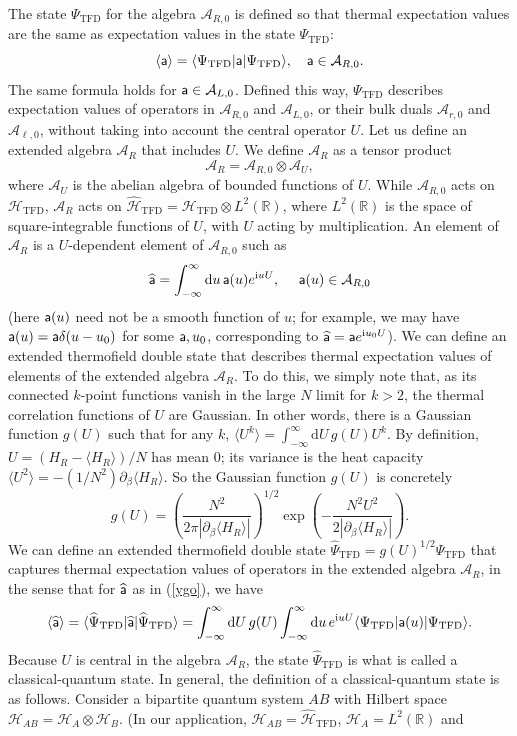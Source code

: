 \documentclass[11pt,a4paper]{article}
\def\a{{\sf a}}
\def\i{{\mathrm i}}
\def\be{\begin{equation}}
\def\ee{\end{equation}}
\def\h{\widehat}
\def\A{{\mathcal A}}
\def\d{{\mathrm d}}
\def\R{{\mathbb R}}
\def\U{{ U}}
\def\h{\widehat}
\def\la{\langle}
\def\ra{\rangle}
\def\H{{\mathcal H}}
\def\TFD{{\mathrm{TFD}}}
\begin{document}
The state $\Psi_\TFD$ for the algebra $\A_{R,0}$ is defined so that thermal expectation values are the same as expectation values in the state $\Psi_\TFD$:
\be\label{wonko} \la \a\ra=\la\Psi_\TFD|\a|\Psi_\TFD\ra,~~~ \a\in \A_{R,0}.\ee
The same formula holds for $\a\in\A_{L,0}$.   Defined this way, $\Psi_\TFD$ describes expectation values of operators in $\A_{R,0}$ and $\A_{L,0}$, or their
bulk duals $\A_{r,0}$ and $\A_{\ell,0}$, without taking into account the central operator $\U$.   Let us define an extended algebra $\A_R$ that includes
$\U$.   
We define $\A_R$ as a tensor product 
\be\label{deften}\A_R=\A_{R,0}\otimes \A_\U,\ee
 where $\A_\U$ is the abelian algebra of bounded functions of $\U$.
While $\A_{R,0}$ acts on  $\H_\TFD$, $\A_R$ acts on $\h\H_\TFD=\H_\TFD\otimes L^2(\R)$, where $L^2(\R)$ is the space of square-integrable
functions of $\U$, with $\U$ acting by multiplication. 
An element of $\A_R$ is a $\U$-dependent element of $\A_{R,0}$ such as
\be\label{ygo}\h \a =\int_{-\infty}^\infty \d u \,\a(u) e^{\i u \U},~~~~ \a(u)\in\A_{R,0}\ee
(here $\a(u)$ need not be a smooth function of $u$; for example, we may have $\a(u)=\a \delta(u-u_0)$ for some $\a, u_0$, corresponding to
$\h\a=\a e^{\i u_0\U}$). 
We can define an extended thermofield double state that describes thermal expectation values of elements of the extended
algebra $ \A_R$.   To do this, we simply note that, as its connected $k$-point functions vanish in the large $N$ limit for $k>2$, the thermal correlation
functions of $\U$ are Gaussian.   In other words, there is a Gaussian function $g(\U)$ such that for any $k$, $\la \U^k\ra=\int_{-\infty}^\infty \d \U \,g(\U) \U^k$.
By definition, $\U=(H_R-\la H_R\ra)/N$ has mean 0; its variance is the heat capacity $\la \U^2\ra=-(1/N^2)\partial_\beta \la H_R\ra.$  So the Gaussian
function $g(\U)$ is concretely
\be\label{gaussf} g(\U)=\left(\frac{N^2}{2\pi |\partial_\beta\la H_R\ra |}\right)^{1/2} \exp\left(-\frac{N^2 \U^2}{2|\partial_\beta \la H_R\ra|}\right). \ee
We can define an extended thermofield double state $\h\Psi_\TFD= g(\U)^{1/2}\Psi_\TFD$ that captures thermal expectation values of operators in the
extended algebra $\A_R$, in the sense that for $\h \a$ as in (\ref{ygo}), we have
\be\label{wygo}\la\h \a\ra=\la\h\Psi_\TFD|\h \a|\h\Psi_\TFD\ra=\int_{-\infty}^\infty \d \U\,g(\U) \int_{-\infty}^\infty\d u\,e^{\i u\U} \la\Psi_\TFD|\a(u)|\Psi_\TFD\ra.\ee
Because $\U$ is central in the algebra $\A_R$, the state $\h\Psi_\TFD$ is what is called a classical-quantum state.   In general, the definition of a classical-quantum
state is as follows.  Consider a bipartite quantum system $AB$ with Hilbert space $\H_{AB}=\H_A\otimes \H_B$.   (In our application, $\H_{AB}=\h\H_\TFD$, $\H_A=L^2(\R)$ and
\end{document}
